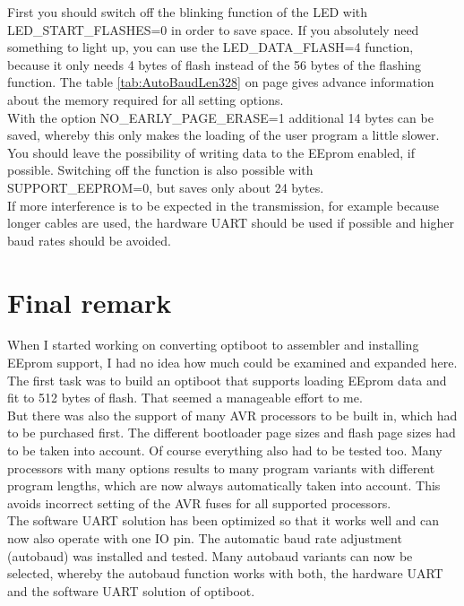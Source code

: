 \begin{itemize}
First you should switch off the blinking function of the LED with LED\_START\_FLASHES=0 in order to save space.
If you absolutely need something to light up, you can use the LED\_DATA\_FLASH=4 function,
because it only needs 4 bytes of flash instead of the 56 bytes of the flashing function.
The table \ref{tab:AutoBaudLen328} on page \pageref{tab:AutoBaudLen328} gives advance information
about the memory required for all setting options.\\
With the option NO\_EARLY\_PAGE\_ERASE=1 additional 14 bytes can be saved,
whereby this only makes the loading of the user program a little slower.\\
You should leave the possibility of writing data to the EEprom enabled, if possible.
Switching off the function is also possible with SUPPORT\_EEPROM=0, but saves only about 24 bytes.\\

If more interference is to be expected in the transmission, for example because longer cables are used,
the hardware UART should be used if possible and higher baud rates should be avoided.
	

\end{itemize}

\section{Final remark}

When I started working on converting optiboot to assembler and installing EEprom support,
I had no idea how much could be examined and expanded here.
The first task was to build an optiboot that supports loading EEprom data and fit to 512 bytes of flash.
That seemed a manageable effort to me.\\

But there was also the support of many AVR processors to be built in,
which  had to be purchased first.
The different bootloader page sizes and flash page sizes had to be taken into account.
Of course everything also had to be tested too.
Many processors with many options results to many program variants with different program lengths,
which are now always automatically taken into account.
This avoids incorrect setting of the AVR fuses for all supported processors.\\
The software UART solution has been optimized so that it works well and can now also operate with one IO pin.
The automatic baud rate adjustment (autobaud) was installed and tested.
Many autobaud variants can now be selected, whereby the autobaud function works with both,
the hardware UART and the software UART solution of optiboot.\\


